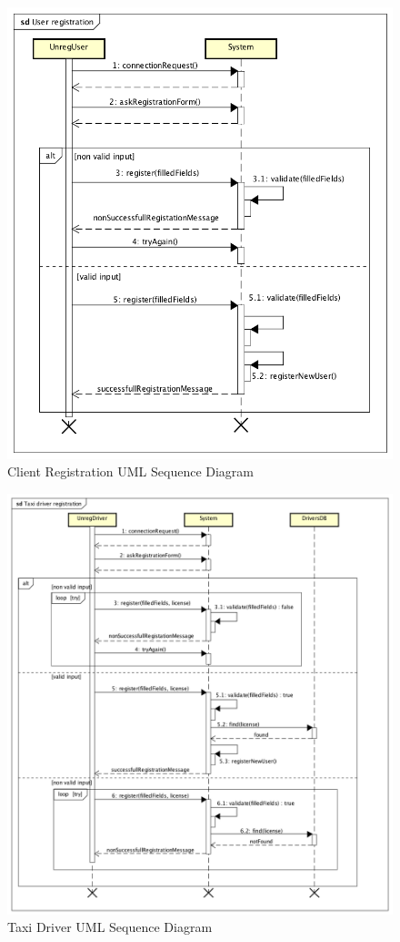 \documentclass[a4paper]{article}
\begin{document}
\begin{figure}[H]
\includegraphics[width=\sequenceWidth]{Sequence-Client-Registration}
\centering
\caption{Client Registration UML Sequence Diagram}
\label{fig:sequenceclientregistration}
\end{figure}

\begin{figure}[H]
\includegraphics[width=\sequenceWidth]{Sequence-TaxiDriver-Registration}
\centering
\caption{Taxi Driver UML Sequence Diagram}
\label{fig:sequencetaxidriverregistration}
\end{figure}
\end{document}
